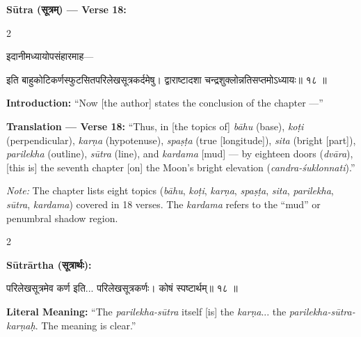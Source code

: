 \documentclass[11pt,a4paper]{article}
\newcommand{\dev}[1]{{\devanagarifont #1}}
\newenvironment{sanskritverse}{%
  \begin{center}\begin{minipage}{0.95\textwidth}
  \setlength{\leftskip}{1em}
  \setlength{\rightskip}{1em}
  \dev
}{\end{minipage}\end{center}}
\begin{document}
\vspace{0.5em}
\noindent\textbf{Sūtra (\dev{सूत्रम्}) — Verse 18:}

\begin{paracol}{2}

\begin{sanskritverse}
इदानीमध्यायोपसंहारमाह—
\end{sanskritverse}

\begin{sanskritverse}
इति बाहुकोटिकर्णस्फुटसितपरिलेखसूत्रकर्दमेषु।
द्वाराष्टादशा चन्द्रशुक्लोन्नतिसप्तमोऽध्यायः॥ १८ ॥
\end{sanskritverse}

\switchcolumn

\textbf{Introduction:} ``Now [the author] states the conclusion of the chapter ---''

\textbf{Translation — Verse 18:} ``Thus, in [the topics of] \textit{bāhu} (base), \textit{koṭi} (perpendicular), \textit{karṇa} (hypotenuse), \textit{spaṣṭa} (true [longitude]), \textit{sita} (bright [part]), \textit{parilekha} (outline), \textit{sūtra} (line), and \textit{kardama} [mud] --- by eighteen doors (\textit{dvāra}), [this is] the seventh chapter [on] the Moon's bright elevation (\textit{candra-śuklonnati}).''

\textit{Note:} The chapter lists eight topics (\textit{bāhu}, \textit{koṭi}, \textit{karṇa}, \textit{spaṣṭa}, \textit{sita}, \textit{parilekha}, \textit{sūtra}, \textit{kardama}) covered in 18 verses. The \textit{kardama} refers to the ``mud'' or penumbral shadow region.

\end{paracol}

\vspace{0.5em}

\begin{paracol}{2}

\noindent\textbf{Sūtrārtha (\dev{सूत्रार्थः}):}
\begin{sanskritverse}
परिलेखसूत्रमेव कर्ण इति... परिलेखसूत्रकर्णः। कोषं स्पष्टार्थम्॥ १८ ॥
\end{sanskritverse}

\switchcolumn

\textbf{Literal Meaning:} ``The \textit{parilekha-sūtra} itself [is] the \textit{karṇa}... the \textit{parilekha-sūtra-karṇaḥ}. The meaning is clear.''

\end{paracol}
\end{document}
